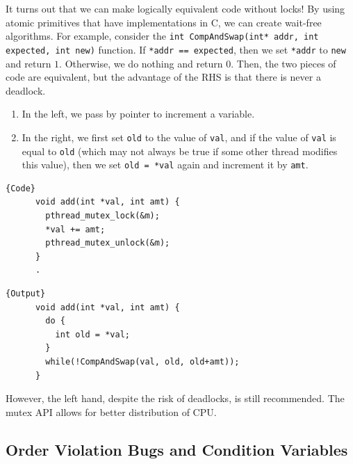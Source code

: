 \documentclass{article}
\newcounter{example}[section]
\newcounter{algo}[section]
\newcounter{code}[section]
\begin{document}
    It turns out that we can make logically equivalent code without locks! By using atomic primitives that have implementations in C, we can create wait-free algorithms. For example, consider the \texttt{int CompAndSwap(int* addr, int expected, int new)} function. If \texttt{*addr == expected}, then we set \texttt{*addr} to \texttt{new} and return $1$. Otherwise, we do nothing and return $0$. Then, the two pieces of code are equivalent, but the advantage of the RHS is that there is never a deadlock. \begin{enumerate}
      \item In the left, we pass by pointer to increment a variable. 
      \item In the right, we first set \texttt{old} to the value of \texttt{val}, and if the value of \texttt{val} is equal to \texttt{old} (which may not always be true if some other thread modifies this value), then we set \texttt{old = *val} again and increment it by \texttt{amt}. 
    \end{enumerate}
    \noindent\begin{minipage}{.5\textwidth}
    \begin{lstlisting}[]{Code}
      void add(int *val, int amt) {
        pthread_mutex_lock(&m); 
        *val += amt; 
        pthread_mutex_unlock(&m); 
      }
      .
    \end{lstlisting}
    \end{minipage}
    \hfill
    \begin{minipage}{.49\textwidth}
    \begin{lstlisting}[]{Output}
      void add(int *val, int amt) {
        do {
          int old = *val;    
        }
        while(!CompAndSwap(val, old, old+amt)); 
      }
    \end{lstlisting}
    \end{minipage}
    However, the left hand, despite the risk of deadlocks, is still recommended. The mutex API allows for better distribution of CPU. 

       
  \subsection{Order Violation Bugs and Condition Variables} 
\end{document}
